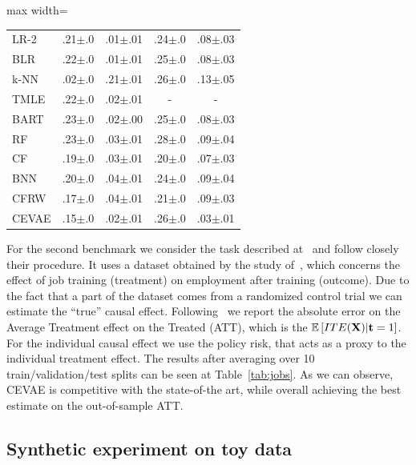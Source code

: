 \begin{table}[htb!]
\begin{minipage}{.45\linewidth}
\begin{adjustbox}{max width=\linewidth}
\begin{tabular}{lcccc}
LR-2 & .21$\pm$.0 & .01$\pm$.01 & .24$\pm$.0 & .08$\pm$.03\\
BLR & .22$\pm$.0 & .01$\pm$.01 & .25$\pm$.0 & .08$\pm$.03 \\
k-NN & .02$\pm$.0 & .21$\pm$.01 & .26$\pm$.0 & .13$\pm$.05\\
TMLE & .22$\pm$.0 & .02$\pm$.01 & - & - \\
BART & .23$\pm$.0 & .02$\pm$.00 & .25$\pm$.0 & .08$\pm$.03 \\
RF & .23$\pm$.0 & .03$\pm$.01 & .28$\pm$.0 & .09$\pm$.04 \\
CF & .19$\pm$.0 & .03$\pm$.01 & .20$\pm$.0 & .07$\pm$.03 \\
BNN & .20$\pm$.0 & .04$\pm$.01 & .24$\pm$.0 & .09$\pm$.04 \\
CFRW &.17$\pm$.0 & .04$\pm$.01 & .21$\pm$.0 & .09$\pm$.03\\\midrule
CEVAE & .15$\pm$.0 & .02$\pm$.01 & .26$\pm$.0 & .03$\pm$.01\\
\bottomrule
\end{tabular}%
\end{adjustbox}
\end{minipage}
\end{table}

For the second benchmark we consider the task described at~\cite{shalit2016estimating} and follow closely their procedure. It uses a dataset obtained by the study of~\cite{lalonde1986evaluating,smith2005does}, which concerns the effect of job training (treatment) on employment after training (outcome). Due to the fact that a part of the dataset comes from a randomized control trial we can estimate the ``true'' causal effect. Following~\cite{shalit2016estimating} we report the absolute error on the Average Treatment effect on the Treated (ATT), which is the $\mathbb{E}\left[ITE(\mathbf{X})|\mathbf{t}=1\right]$. For the individual causal effect we use the policy risk, that acts as a proxy to the individual treatment effect. The results after averaging over 10 train/validation/test splits can be seen at Table~\ref{tab:jobs}. As we can observe, CEVAE is competitive with the state-of-the art, while overall achieving the best estimate on the out-of-sample ATT.


\subsection{Synthetic experiment on toy data}

